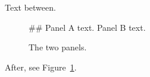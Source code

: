 \documentclass{article}
\newenvironment{subcolumns}[1][\columnwidth]
 {\valign\bgroup\hsize=#1\vfil##\vfil\cr}
 {\crcr\egroup}
\newcommand{\nextsubcolumn}{\cr\noalign{\hfill}}
\begin{document}
Text  between.


\begin{figure}
\begin{subcolumns}[0.3\textwidth]
Panel A text.
\nextsubcolumn
Panel B text.
\end{subcolumns}
\caption{The two panels.}\label{fig:panels}
\end{figure}
After, see Figure~\ref{fig:panels}.
\end{document}
